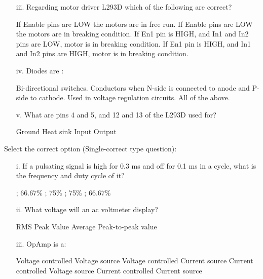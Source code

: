 \documentclass[12pt]{exam}
\begin{document}
\begin{questions}
\begin{enumerate}
\item[iii.]   Regarding motor driver L293D which of the following are correct?
\begin{choices}
\choice If Enable pins are LOW the motors are in free run.
\choice  If Enable pins are LOW the motors are in breaking condition.
\choice  If En1 pin is HIGH, and In1 and In2 pins are LOW, motor is in breaking condition.
\choice  If En1 pin is HIGH, and In1 and In2 pins are HIGH, motor is in breaking condition.
\end{choices}
\newpage

\item[iv.] Diodes are	:
\begin{choices}
\choice  Bi-directional switches.
\choice Conductors when N-side is connected to anode and P-side to cathode.
\choice Used in voltage regulation circuits.
\choice All of the above.
\end{choices}

\item[v.]  What are pins 4 and 5, and 12 and 13 of the L293D used for?
\begin{multicols}{2}
\begin{choices}
\choice Ground
\choice Heat sink
\choice Input
\choice Output
\end{choices}
\end{multicols}
\end{enumerate}

\question[5] Select the correct option (Single-correct type question):
\begin{enumerate}
\item[i.] If a pulsating signal is high for 0.3 ms and off for 0.1 ms in a cycle, what is the frequency and duty cycle of it?
\begin{multicols}{2}
\begin{choices}
 ; 66.67\% 
 ; 75\%
 ; 75\%
 ; 66.67\%
\end{choices}
\end{multicols}

\item[ii.]What voltage will an ac voltmeter display?
\begin{multicols}{2}
\begin{choices}
\choice RMS
\choice Peak Value
\choice Average
\choice Peak-to-peak value
\end{choices}
\end{multicols}

\item[iii.]OpAmp is a:
\begin{choices}
\choice Voltage controlled Voltage source
\choice Voltage controlled Current source
\choice Current controlled Voltage source
\choice Current controlled Current source
\end{choices}



\end{enumerate}
\end{questions}
\end{document}
